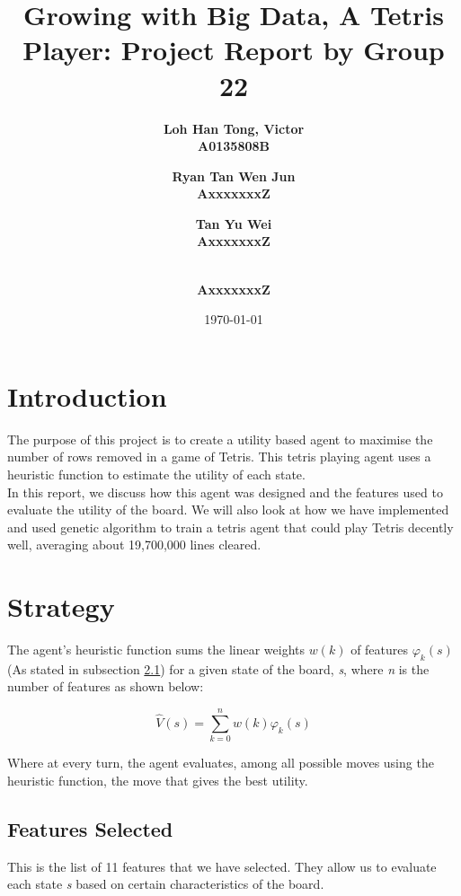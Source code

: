 \documentclass[a4paper,12pt,twocolumn]{article}
\begin{document}
\setlength{\parindent}{0pt}

\title{Growing with Big Data, A Tetris Player: Project Report by Group 22}
\author{\bf{Loh Han Tong, Victor} \\ A0135808B
    \and \bf{Ryan Tan Wen Jun} \\ AxxxxxxxZ \and \bf {Tan Yu Wei} \\ AxxxxxxxZ
    \and \bf{} \\ AxxxxxxxZ
}
\date{\today}
\maketitle

\section{Introduction}
The purpose of this project is to create a utility based agent to maximise the
number of rows removed in a game of Tetris. This tetris playing agent uses a heuristic
function to estimate the utility of each state.\\

In this report, we discuss how this agent was designed and the features used to
evaluate the utility of the board. We will also look at how we have implemented
and used genetic algorithm to train a tetris agent that could play Tetris decently well,
averaging about 19,700,000 lines cleared.

\section{Strategy}
The agent's heuristic function sums the linear weights $w(k)$ of features $\varphi_k(s)$
(As stated in subsection \ref{features_subsection}) for a given state of the board,
\textit{s}, where \textit{n} is the number of features as shown below:

\[
    \hat V(s) = \sum_{k=0}^{n}w(k)\varphi_k(s)
\]

Where at every turn, the agent evaluates, among all possible moves using the
heuristic function, the move that gives the best utility.

\subsection{Features Selected}
\label{features_subsection}
This is the list of 11 features that we have selected. They allow us to
evaluate each state \textit{s} based on certain characteristics of the board.\\
\end{document}
